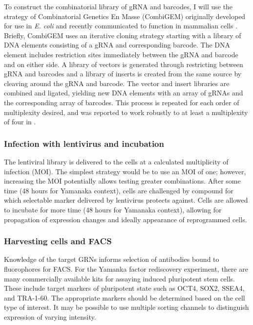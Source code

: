 \documentclass[10pt]{article}
\begin{document}
To construct the combinatorial library of gRNA and barcodes, I will use the strategy of Combinatorial Genetics En Masse (CombiGEM) \cite{cheng2014enhanced} originally developed for use in \textit{E. coli} and recently communicated to function in mammalian cells \cite{lu2015combigem}. Briefly, CombiGEM uses an iterative cloning strategy starting with a library of DNA elements consisting of a gRNA and corresponding barcode. The DNA element includes restriction sites immediately between the gRNA and barcode and on either side. A library of vectors is generated through restricting between gRNA and barcodes and a library of inserts is created from the same source by cleaving around the gRNA and barcode. The vector and insert libraries are combined and ligated, yielding new DNA elements with an array of gRNAs and the corresponding array of barcodes. This process is repeated for each order of multiplexity desired, and was reported to work robustly to at least a multiplexity of four in \cite{cheng2014enhanced}.

\subsubsection{Infection with lentivirus and incubation}

The lentiviral library is delivered to the cells at a calculated multiplicity of infection (MOI). The simplest strategy would be to use an MOI of one; however, increasing the MOI potentially allows testing greater combinations. After some time (48 hours for Yamanaka context), cells are challenged by compound for which selectable marker delivered by lentivirus protects against. Cells are allowed to incubate for more time (48 hours for Yamanaka context), allowing for propagation of expression changes and ideally appearance of reprogrammed cells.

\subsubsection{Harvesting cells and FACS}

Knowledge of the target GRNs informs selection of antibodies bound to fluorophores for FACS. For the Yamanka factor rediscovery experiment, there are many commercially available kits for assaying induced pluripotent stem cells. These include target markers of pluripotent state such as OCT4, SOX2, SSEA4, and TRA-1-60. The appropriate markers should be determined based on the cell type of interest. It may be possible to use multiple sorting channels to distinguish expression of varying intensity.
\end{document}
